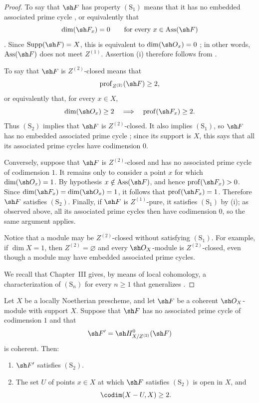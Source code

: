 \begin{proof}
To say that $\sh F$ has property $(\mathrm S_1)$ means that it
has no embedded associated prime cycle , or
equivalently that
\[
  \dim(\sh F_x)=0
  \qquad\text{for every }x\in\operatorname{Ass}(\sh F)
\]
.  Since $\operatorname{Supp}(\sh F)=X$, this is
equivalent to $\dim(\sh O_x)=0$ ; in other
words, $\operatorname{Ass}(\sh F)$ does not meet $Z^{(1)}$.
Assertion {\rm(i)} therefore follows from .

To say that $\sh F$ is $Z^{(2)}$-closed means that
\[
  \operatorname{prof}_{Z^{(2)}}(\sh F)\geq2,
\]
or equivalently that, for every $x\in X$,
\[
  \dim(\sh O_x)\geq2
  \quad\Longrightarrow\quad
  \operatorname{prof}(\sh F_x)\geq2.
\]
Thus $(\mathrm S_2)$ implies that $\sh F$ is $Z^{(2)}$-closed.
It also implies $(\mathrm S_1)$, so $\sh F$ has no embedded
associated prime cycle ; since its support is
$X$, this says that all its associated prime cycles have
codimension $0$.

Conversely, suppose that $\sh F$ is $Z^{(2)}$-closed and has no
associated prime cycle of codimension $1$.  It remains only to
consider a point $x$ for which $\dim(\sh O_x)=1$.  By hypothesis
$x\notin\operatorname{Ass}(\sh F)$, and hence
$\operatorname{prof}(\sh F_x)>0$.  Since
$\dim(\sh F_x)=\dim(\sh O_x)=1$, it follows that
$\operatorname{prof}(\sh F_x)=1$.  Therefore $\sh F$ satisfies
$(\mathrm S_2)$.  Finally, if $\sh F$ is $Z^{(1)}$-pure, it
satisfies $(\mathrm S_1)$ by {\rm(i)}; as observed above, all its
associated prime cycles then have codimension $0$, so the same
argument applies.

Notice that a module may be $Z^{(2)}$-closed without satisfying
$(\mathrm S_1)$.  For example, if $\dim X=1$, then
$Z^{(2)}=\varnothing$ and every $\sh O_X$-module is
$Z^{(2)}$-closed, even though a module may have embedded
associated prime cycles.

We recall that Chapter~III gives, by means of local cohomology, a
characterization of $(\mathrm S_n)$ for every $n\geq1$ that
generalizes .
\end{proof}

\begin{corollary}[5.10.15]
\label{IV.5.10.15}
Let $X$ be a locally Noetherian prescheme, and let $\sh F$ be a
coherent $\sh O_X$-module with support $X$.  Suppose that $\sh F$
has no associated prime cycle of codimension $1$ and that
\[
  \sh F'=\sh H^0_{X/Z^{(2)}}(\sh F)
\]
is coherent.  Then:
\begin{enumerate}[{\rm(i)}]
  \item $\sh F'$ satisfies $(\mathrm S_2)$.


  \item The set $U$ of points $x\in X$ at which $\sh F$
  satisfies $(\mathrm S_2)$  is open in $X$, and
  \[
    \codim(X-U,X)\geq2.
  \]
\end{enumerate}
\end{corollary}

